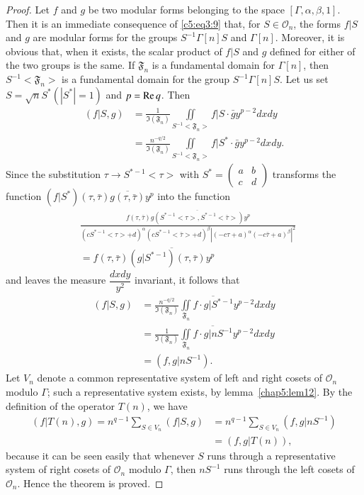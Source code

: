 \begin{proof}
Let $f$ and $g$ be two modular forms belonging to the space $[\Gamma,
  \alpha, \beta, 1]$. Then it is an immediate consequence of \eqref{c5:eq3:9}
that, for $S\in \mathcal{O}_n$, the forms $f|S$ and $g$ are
modular forms for the groups $S^{-1}\Gamma[n]S$ and
$\Gamma[n]$. Moreover, it is obvious that, when it exists, the scalar
product of $f|S$ and $g$ defined for either of the two groups is the
same. If $\mathfrak{F}_n$ is a fundamental domain for $\Gamma[n]$,
then $S^{-1}<\mathfrak{F}_n>$ is a fundamental domain for the group
$S^{-1}\Gamma[n]S$. Let us set $S = \surd n S^{\ast}(|S^{\ast}|=1)$
and $p=\operatorname{Re} q$. Then 
\begin{align*}
(f|S, g) & = \frac{1}{\mathfrak{I}(\mathfrak{F}_n)}
  \iint\limits_{S^{-1}<\mathfrak{F}_n>} f|S\cdot \bar{g} y^{p-2} dx
  dy\\
& = \frac{n^{-q/2}}{\mathfrak{I}(\mathfrak{F}_n)}
  \iint\limits_{S^{-1}<\mathfrak{F}_n>} f|S^{\ast} \cdot\bar{g}
  y^{p-2} dx dy. 
\end{align*}
Since \pageoriginale the substitution $\tau\to S^{\ast-1}<\tau>$ with
$S^{\ast}= \left(\begin{smallmatrix}
  a&b\\c&d \end{smallmatrix}\right)$ transforms the function
$(f|S^{\ast})(\tau,\bar{\tau})\overline{g(\tau,\bar{\tau})}y^p$ into
the function 
\begin{align*}
& \frac{f(\tau,\bar{\tau}) \overline{g(S^{\ast-1} <\tau>,
      S^{\ast-1} <\bar{\tau}>)}y^p}{(c S^{\ast-1} <\tau>+d)^{\alpha}
  (cS^{\ast-1}<\bar{\tau}>+d)^{\beta} | (-c\tau+a)^{\alpha}
  (-c\bar{\tau}+a)^{\beta}|^2 }    \\
& = f(\tau,\bar{\tau}) \overline{(g|S^{\ast-1})(\tau,\bar{\tau})y^p}
\end{align*}
and leaves the measure $\dfrac{dx dy}{y^2}$ invariant, it follows that 
\begin{align*}
(f|S,g) & = \frac{n^{-q/2}}{\mathfrak{I}(\mathfrak{F}_n)}
  \iint\limits_{\mathfrak{F}_n} \overline{f\cdot g |S^{\ast-1}}
  y^{p-2} dx dy\\
& = \frac{1}{\mathfrak{I}(\mathfrak{F}_n)}
  \iint\limits_{\mathfrak{F}_n} \overline{f\cdot g|n S^{-1}}
  y^{p-2} dx dy\\
& = (f,g|nS^{-1}).
\end{align*}
Let $V_n$ denote a common representative system of left and right
cosets of $\mathcal{O}_n$ modulo $\Gamma$; such a representative
system exists, by lemma~\ref{chap5:lem12}. 
By the definition of the operator $T(n)$, we have 
\begin{align*}
(f|T(n),g)= n^{q-1} \sum_{S \in V_n} (f|S, g) & = n^{q-1}
  \sum_{S\in V_n}(f,g|n S^{-1})\\
& = (f,g|T(n)), 
\end{align*}
because it can be seen easily that whenever $S$ runs through a
representative system of right cosets of $\mathcal{O}_n$ modulo
$\Gamma$, then $nS^{-1}$ runs through the left cosets of
$\mathcal{O}_n$. Hence the theorem is proved.
\end{proof}

